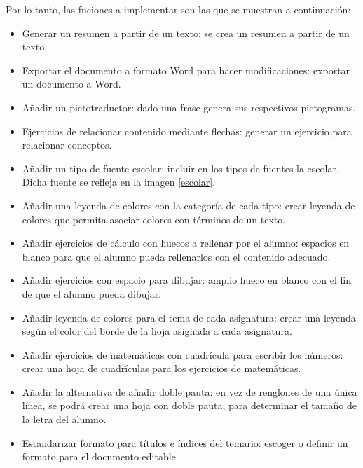 Por lo tanto, las fuciones a implementar son las que se muestran a continuación:


\begin{itemize}
  \item Generar un resumen a partir de un texto: se crea un resumen a partir de un texto.
  \item Exportar el documento a formato Word para hacer modificaciones: exportar un documento a Word.
  \item Añadir un pictotraductor: dado una frase genera sus respectivos pictogramas.
  \item Ejercicios de relacionar contenido mediante flechas: generar un ejercicio para relacionar conceptos.
  \item Añadir un tipo de fuente escolar: incluir en los tipos de fuentes la escolar. Dicha fuente se refleja en la imagen \ref{escolar}.
  \item Añadir una leyenda de colores con la categoría de cada tipo: crear leyenda de colores que permita asociar colores con términos de un texto.
  \item  Añadir ejercicios de cálculo con huecos a rellenar por el alumno: espacios en blanco para que el alumno pueda rellenarlos con el contenido adecuado.
  \item  Añadir ejercicios con espacio para dibujar: amplio hueco en blanco con el fin de que el alumno pueda dibujar.
  \item Añadir leyenda de colores para el tema de cada asignatura: crear una leyenda según el color del borde de la hoja asignada a cada asignatura.
  \item Añadir ejercicios de matemáticas con cuadrícula para escribir los números: crear una hoja de cuadrículas para los ejercicios de matemáticas.
  \item Añadir la alternativa de añadir doble pauta: en vez de renglones de una única línea, se podrá crear una hoja con doble pauta, para determinar el tamaño de la letra del alumno.
  \item Estandarizar formato para títulos e índices del temario: escoger o definir un formato para el documento editable.

\end{itemize}                                               

